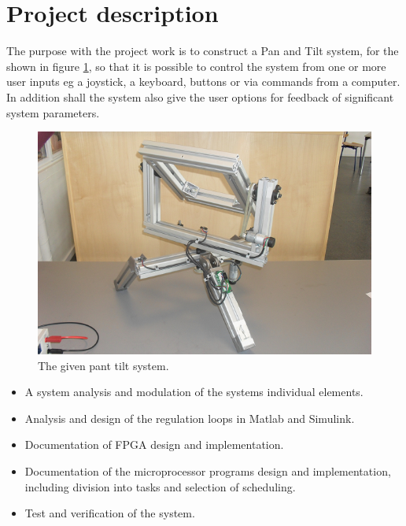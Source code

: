 
\section{Project description}
The purpose with the project work is to construct a Pan and Tilt system, for the  shown in figure \ref{fig:pantilysystem}, so that it is possible to control the system from one or more user inputs eg a joystick, a keyboard, buttons or via commands from a computer. In addition shall the system also give the user options for feedback of significant system parameters.

\begin{figure}[htb]
	\begin{center}
	\includegraphics[scale=1,trim=0 0 0 0]{graphics/pantiltsystem.png} %
	\caption{The given pant tilt system.}
	\label{fig:pantilysystem}			%
	\end{center}
\end{figure}

\begin{itemize}
\item A system analysis and modulation of the systems individual elements.
\item Analysis and design of the regulation loops in Matlab and Simulink.
\item Documentation of FPGA design and implementation.
\item Documentation of the microprocessor programs design and implementation, including division into tasks and selection of scheduling.
\item Test and verification of the system.
\end{itemize}

